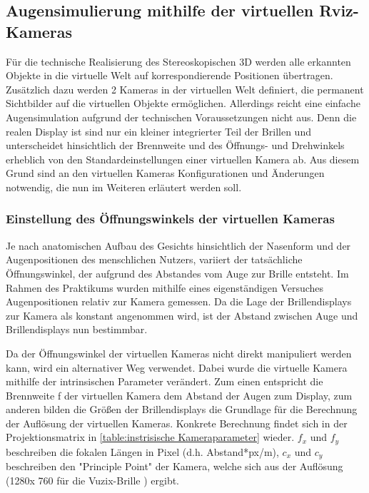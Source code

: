 \subsection{Augensimulierung mithilfe der virtuellen Rviz-Kameras }
Für die technische Realisierung des Stereoskopischen 3D werden alle erkannten Objekte in die virtuelle Welt auf korrespondierende Positionen übertragen. Zusätzlich dazu werden 2 Kameras in der virtuellen Welt definiert, die permanent Sichtbilder auf die virtuellen Objekte ermöglichen. Allerdings reicht eine einfache Augensimulation aufgrund der technischen Voraussetzungen nicht aus. Denn die realen Display ist sind nur ein kleiner integrierter Teil der Brillen und unterscheidet hinsichtlich der Brennweite und des Öffnungs- und Drehwinkels erheblich von den Standardeinstellungen einer virtuellen Kamera ab. Aus diesem Grund sind an den virtuellen Kameras Konfigurationen und Änderungen notwendig, die nun im Weiteren erläutert werden soll. 


\subsubsection{Einstellung des Öffnungswinkels der virtuellen Kameras}

Je nach anatomischen Aufbau des Gesichts hinsichtlich  der Nasenform und der Augenpositionen des menschlichen Nutzers, variiert der tatsächliche Öffnungswinkel, der aufgrund des Abstandes vom Auge zur Brille entsteht. Im Rahmen des Praktikums wurden mithilfe eines eigenständigen Versuches Augenpositionen relativ zur Kamera gemessen. Da die Lage der Brillendisplays zur Kamera als konstant angenommen wird, ist der Abstand zwischen Auge und Brillendisplays nun bestimmbar.

Da der Öffnungswinkel der virtuellen Kameras nicht direkt manipuliert werden kann, wird ein alternativer Weg verwendet. Dabei wurde die virtuelle Kamera mithilfe der intrinsischen Parameter verändert. Zum einen entspricht die Brennweite f der virtuellen Kamera dem Abstand der Augen zum Display, zum anderen bilden die Größen der Brillendisplays die Grundlage für die Berechnung der Auflösung der virtuellen Kameras. Konkrete Berechnung findet sich in der Projektionsmatrix in \ref{table:instrisische Kameraparameter} wieder. $f_x$ und $f_y$ beschreiben die fokalen Längen in Pixel (d.h. Abstand*px/m), $c_x$ und $c_y$ beschreiben den "Principle Point" der Kamera, welche sich aus der Auflösung (1280x 760 für die Vuzix-Brille ) ergibt. 

%

